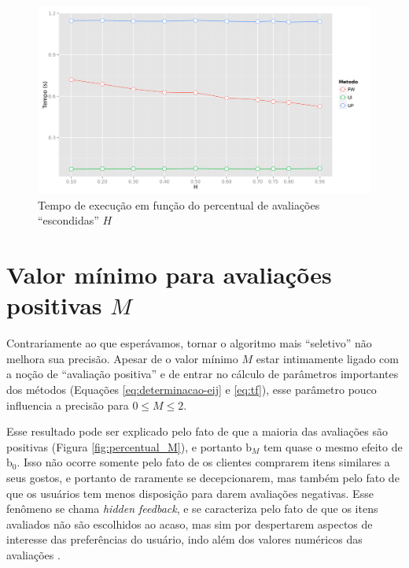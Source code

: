 \begin{figure}[htp]
    \begin{center}
    \includegraphics[width=1\textwidth]{img/time_H}
    \end{center}
    \caption{Tempo de execução em função do percentual de avaliações ``escondidas'' $H$}
    \label{fig:time_H}
\end{figure}


\section{Valor mínimo para avaliações positivas $M$} %
\label{sec:valor_m_nimo_para_avalia_es_positivas_}

Contrariamente ao que esperávamos, tornar o algoritmo mais ``seletivo'' não melhora sua precisão. Apesar de o valor mínimo $M$ estar intimamente ligado com a noção de ``avaliação positiva'' e de entrar no cálculo de parâmetros importantes dos métodos (Equações \ref{eq:determinacao-eij} e \ref{eq:tf}), esse parâmetro pouco influencia a precisão para $0 \leq M \leq 2$. 

Esse resultado pode ser explicado pelo fato de que a maioria das avaliações são positivas (Figura \ref{fig:percentual_M}), e portanto $\mathrm{b}_M$ tem quase o mesmo efeito de $\mathrm{b}_0$. Isso não ocorre somente pelo fato de os clientes comprarem itens similares a seus gostos, e portanto de raramente se decepcionarem, mas também pelo fato de que os usuários tem menos disposição para darem avaliações negativas. Esse fenômeno se chama \textit{hidden feedback}, e se caracteriza pelo fato de que os itens avaliados não são escolhidos ao acaso, mas sim por despertarem aspectos de interesse das preferências do usuário, indo além dos valores numéricos das avaliações \cite{lops2011content-chap5}.

